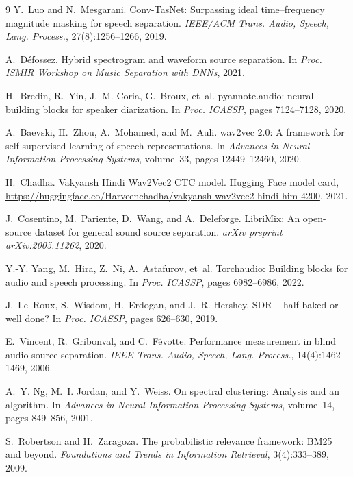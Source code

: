 \documentclass[11pt,a4paper,twocolumn]{article}
\begin{document}
\begin{thebibliography}{9}
\small
{}
Y.~Luo and N.~Mesgarani.
\newblock Conv-TasNet: Surpassing ideal time--frequency magnitude masking for speech separation.
\newblock \emph{IEEE/ACM Trans. Audio, Speech, Lang. Process.}, 27(8):1256--1266, 2019.

A.~D{\'e}fossez.
\newblock Hybrid spectrogram and waveform source separation.
\newblock In \emph{Proc. ISMIR Workshop on Music Separation with DNNs}, 2021.

H.~Bredin, R.~Yin, J.~M. Coria, G.~Broux, et~al.
\newblock pyannote.audio: neural building blocks for speaker diarization.
\newblock In \emph{Proc. ICASSP}, pages 7124--7128, 2020.

A.~Baevski, H.~Zhou, A.~Mohamed, and M.~Auli.
\newblock wav2vec 2.0: A framework for self-supervised learning of speech representations.
\newblock In \emph{Advances in Neural Information Processing Systems}, volume~33, pages 12449--12460, 2020.

H.~Chadha.
\newblock Vakyansh Hindi Wav2Vec2 CTC model.
\newblock Hugging Face model card, \url{https://huggingface.co/Harveenchadha/vakyansh-wav2vec2-hindi-him-4200}, 2021.

J.~Cosentino, M.~Pariente, D.~Wang, and A.~Deleforge.
\newblock LibriMix: An open-source dataset for general sound source separation.
\newblock \emph{arXiv preprint arXiv:2005.11262}, 2020.

Y.-Y. Yang, M.~Hira, Z.~Ni, A.~Astafurov, et~al.
\newblock Torchaudio: Building blocks for audio and speech processing.
\newblock In \emph{Proc. ICASSP}, pages 6982--6986, 2022.

J.~Le~Roux, S.~Wisdom, H.~Erdogan, and J.~R. Hershey.
\newblock SDR -- half-baked or well done?
\newblock In \emph{Proc. ICASSP}, pages 626--630, 2019.

E.~Vincent, R.~Gribonval, and C.~F{\'e}votte.
\newblock Performance measurement in blind audio source separation.
\newblock \emph{IEEE Trans. Audio, Speech, Lang. Process.}, 14(4):1462--1469, 2006.

A.~Y. Ng, M.~I. Jordan, and Y.~Weiss.
\newblock On spectral clustering: Analysis and an algorithm.
\newblock In \emph{Advances in Neural Information Processing Systems}, volume~14, pages 849--856, 2001.

S.~Robertson and H.~Zaragoza.
\newblock The probabilistic relevance framework: BM25 and beyond.
\newblock \emph{Foundations and Trends in Information Retrieval}, 3(4):333--389, 2009.
\end{thebibliography}
\end{document}
